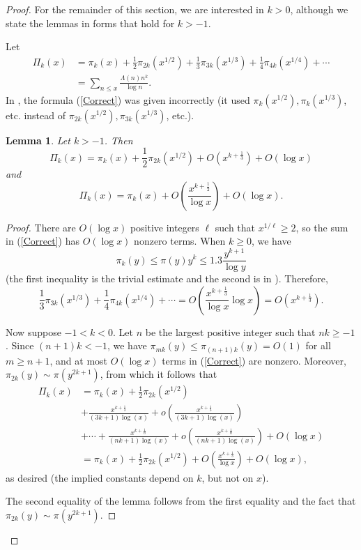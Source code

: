 \documentclass[12pt]{amsart}
\newtheorem{lemma}{Lemma}
\begin{document}
\begin{proof}
For the remainder of this section, we are interested in $k>0$, although we state the lemmas in forms that hold for $k>-1$.


Let
\begin{align}
 \Pi_k(x) &= \pi_k(x) + \frac12\pi_{2k}(x^{1/2})  + \frac13 \pi_{3k}(x^{1/3}) + \frac14\pi_{4k}(x^{1/4}) + \cdots \label{Correct}\\
 &=    \sum_{n\le x} \frac{\Lambda(n) n^k}{\log n}.
\end{align}
In \cite{GW}, the formula (\ref{Correct}) was given incorrectly (it used $\pi_k(x^{1/2}), \pi_k(x^{1/3})$, etc. instead of $\pi_{2k}(x^{1/2}), \pi_{3k}(x^{1/3})$, etc.).

\begin{lemma}\label{Lemma1}
Let $k>-1$. Then
$$
\Pi_k(x) = \pi_k(x) +\frac12 \pi_{2k}(x^{1/2}) + O(x^{k+\frac13}) + O(\log x)
$$
and
$$
\Pi_k(x) = \pi_k(x) + O\left(\frac{x^{k+\frac12}}{\log x}\right) + O(\log x).
$$
\end{lemma}
\begin{proof}
There are $O(\log x)$ positive integers $\ell$ such that $x^{1/\ell}\ge 2$, so the sum in (\ref{Correct}) has $O(\log x)$ nonzero terms. 
When $k\ge 0$, we have
$$
\pi_{k}(y) \le \pi(y) y^k \le 1.3\frac{y^{k+1}}{\log y}
$$
(the first inequality is the trivial estimate and the second is in \cite{RS}).
Therefore,  
$$\frac13\pi_{3k}(x^{1/3})+\frac14\pi_{4k}(x^{1/4}) + \cdots = O\left(\frac{x^{k+\frac13}}{\log x}\log x\right) = O(x^{k+\frac13}).$$

Now suppose $-1<k<0$. Let $n$ be the largest positive integer such that $nk\ge -1$. Since $(n+1)k<-1$, we have $\pi_{mk}(y)\le \pi_{(n+1)k}(y) = O(1)$ for all $m\ge n+1$, and at most $O(\log x)$ terms in (\ref{Correct}) are nonzero.
Moreover, $\pi_{2k}(y)\sim \pi(y^{2k+1})$, from which it follows that
\begin{align*}
\Pi_k(x) &= \pi_k(x) + \frac12\pi_{2k}(x^{1/2}) \\
&+ \frac{x^{k+\frac13}}{(3k+1) \log(x)} + o\left(\frac{x^{k+\frac13}}{(3k+1) \log(x)}\right) \\
&+ \cdots + \frac{x^{k+\frac1n}}{(nk+1) \log(x)}+ o\left(\frac{x^{k+\frac1n}}{(nk+1) \log(x)}\right)  +  O(\log x)\\
&= \pi_k(x) + \frac12\pi_{2k}(x^{1/2})+ O\left(\frac{x^{k+\frac13}}{\log x}\right) + O(\log x),
\end{align*}
as desired (the implied constants depend on $k$, but not on $x$).


The second equality of the lemma follows from the first equality and the fact that $\pi_{2k}(y)\sim \pi(y^{2k+1})$.
\end{proof}


\end{proof}
\end{document}
